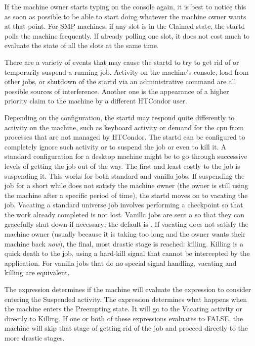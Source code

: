 If the machine owner starts typing on the console again,
it is best to notice this as
soon as possible to be able to start doing whatever 
the machine owner wants at that point.
For SMP machines, if any slot is in the Claimed state, the
startd polls the machine frequently.
If already polling one slot, it does not
cost much to evaluate the state of all the slots at
the same time.

There are a variety of events that may cause the startd to try to get
rid of or temporarily suspend a running job.  Activity on the
machine's console, load from other jobs, or shutdown of the startd via
an administrative command are all possible sources of interference.
Another one is the appearance of a higher priority claim to the
machine by a different HTCondor user.

Depending on the configuration, the startd may respond quite
differently to activity on the machine, such as keyboard activity or
demand for the cpu from processes that are not managed by HTCondor.  The
startd can be configured to completely ignore such activity or to
suspend the job or even to kill it.  A standard configuration for a desktop
machine might be to go through
successive levels of getting the job out of the way.
The first and least costly to the job is suspending it.
This works for both standard and vanilla jobs.
If suspending the job for a short while does not satisfy the machine
owner (the owner is still using the machine after a specific period of
time), the startd moves on to vacating the job.
Vacating a standard universe job
involves performing a checkpoint so that the work already completed
is not lost.  Vanilla jobs are sent a  so that they
can gracefully shut down if necessary; the default is \verb@SIGTERM@.
If vacating does not satisfy the machine owner (usually because it is
taking too long and the owner wants their machine back \emph{now}),
the final, most drastic stage is reached: killing.  
Killing is a quick death to the job, using a hard-kill signal that cannot
be intercepted by the application.  For vanilla jobs that do no special
signal handling, vacating and killing are equivalent.

The  expression determines if the machine will
evaluate the  expression to consider entering the
Suspended activity.
The  expression determines what happens when the
machine enters the Preempting state.
It will go to the Vacating
activity or directly to Killing. 
If one or both of these expressions evaluates to FALSE, the machine
will skip that stage of getting rid of the job and proceed directly to
the more drastic stages.

